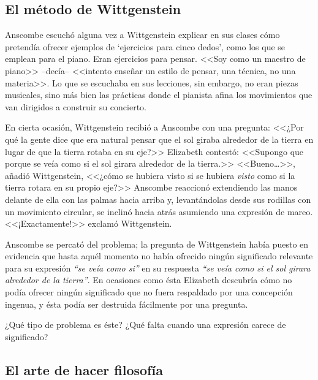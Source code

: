 \subsection{El método de Wittgenstein}

Anscombe escuchó alguna vez a Wittgenstein explicar en sus clases cómo pretendía
ofrecer ejemplos de `ejercicios para cinco dedos', como los que se emplean para
el piano. Eran ejercicios para pensar. <<Soy como un maestro de piano>>
--decía-- <<intento enseñar un estilo de pensar, una técnica, no una materia>>.
Lo que se escuchaba en sus lecciones, sin embargo, no eran piezas musicales,
sino más bien las prácticas donde el pianista afina los movimientos que van
dirigidos a construir su
concierto.\autocite[cf.~][p.~357]{KlaggeNordman2003pubnpriv}

En cierta ocasión, Wittgenstein recibió a Anscombe con una pregunta: <<¿Por qué
la gente dice que era natural pensar que el sol giraba alrededor de la tierra en
lugar de que la tierra rotaba en su eje?>> Elizabeth contestó: <<Supongo que
porque se veía como si el sol girara alrededor de la tierra.>> <<Bueno\ldots>>,
añadió Wittgenstein, <<¿cómo se hubiera visto si se hubiera \emph{visto} como si
la tierra rotara en su propio eje?>> Anscombe reaccionó extendiendo las manos
delante de ella con las palmas hacia arriba y, levantándolas desde sus rodillas
con un movimiento circular, se inclinó hacia atrás asumiendo una expresión de
mareo. <<¡Exactamente!>> exclamó
Wittgenstein.\autocite[cf.~][p.~151]{anscombe1959iwt}

Anscombe se percató del problema; la pregunta de Wittgenstein había puesto en
evidencia que hasta aquél momento no había ofrecido ningún significado relevante
para su expresión \emph{``se veía como si''} en su respuesta \emph{``se veía
  como si el sol girara alrededor de la tierra''}. En ocasiones como ésta
Elizabeth descubría cómo no podía ofrecer ningún significado que no fuera
respaldado por una concepción ingenua, y ésta podía ser destruida fácilmente por
una pregunta. 

¿Qué tipo de problema es éste? ¿Qué falta cuando una expresión carece de
significado?

\subsection{El arte de hacer filosofía}

